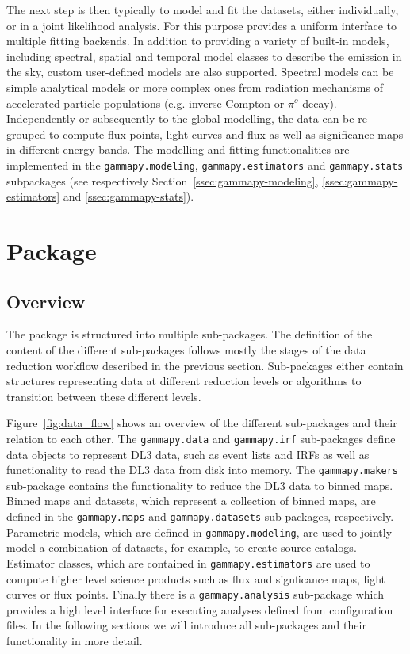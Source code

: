 \documentclass[traditabstract, longauth]{aa}
\newcommand{\code}[1]{\texttt{#1}}
\begin{document}
The next step is then typically to model and fit the datasets, either
individually, or in a joint likelihood analysis. For this purpose \gammapy
provides a uniform interface to multiple fitting backends. In addition to
providing a variety of built-in models, including spectral,
spatial and temporal model classes to describe the \gammaray emission in the sky,
custom user-defined models are also supported.
Spectral models can be simple analytical models or more complex ones from radiation
mechanisms of accelerated particle populations (e.g. inverse Compton or $\pi^{o}$ decay).
Independently or subsequently to the global modelling, the data can be
re-grouped to compute flux points, light curves and flux as well as significance
maps in different energy bands.
The modelling and fitting functionalities are implemented in the \code{gammapy.modeling},
\code{gammapy.estimators} and \code{gammapy.stats} subpackages (see respectively
Section~\ref{ssec:gammapy-modeling}, \ref{ssec:gammapy-estimators} and \ref{ssec:gammapy-stats}).

\section{\gammapy Package}
\label{sec:gammapy-package}
\subsection{Overview}
\label{ssec:overview}
%
%
The \gammapy package is structured into multiple sub-packages. The definition
of the content of the different sub-packages follows mostly the stages of the
data reduction workflow described in the previous section. Sub-packages
either contain structures representing data at different reduction
levels or algorithms to transition between these different levels.

Figure~\ref{fig:data_flow} shows an overview of the different sub-packages and
their relation to each other. The \code{gammapy.data} and \code{gammapy.irf}
sub-packages define data objects to represent DL3 data, such as
event lists and IRFs as well as functionality
to read the DL3 data from disk into memory. The \code{gammapy.makers} sub-package
contains the functionality to reduce the DL3 data to binned maps.
Binned maps and datasets, which represent a collection of binned
maps, are defined in the \code{gammapy.maps} and \code{gammapy.datasets}
sub-packages, respectively. Parametric models, which are defined in
\code{gammapy.modeling}, are used to jointly model a combination
of datasets, for example, to create source catalogs.
Estimator classes, which are contained in \code{gammapy.estimators} are used to
compute higher level science products such as flux and signficance maps,
light curves or flux points. Finally there is a \code{gammapy.analysis}
sub-package which provides a high level interface for executing analyses
defined from configuration files. In the following sections we will
introduce all sub-packages and their functionality in more detail.
\end{document}

